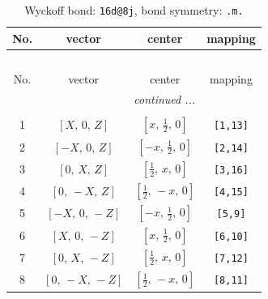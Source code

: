 \documentclass[fleqn,8pt]{jsarticle}
\begin{document}
\begin{longtable}{cccc}
\caption{Wyckoff bond: {\tt 16d@8j}, bond symmetry: {\tt .m.}}
 \\
 \hline \hline
No. & vector & center & mapping \\ \hline \endfirsthead

\multicolumn{3}{l}{\tablename\ \thetable{}} \\
 \hline \hline
No. & vector & center & mapping \\ \hline \endhead

 \hline \hline
\multicolumn{3}{r}{\footnotesize\it continued ...} \\ \endfoot

 \hline \hline
\multicolumn{3}{r}{} \\ \endlastfoot

1 & $\left[ X,\, 0,\, Z \right]$ & $\left[ x,\, \frac{1}{2},\, 0 \right]$ & {\tt [1,13]} \\ \hline
2 & $\left[ - X,\, 0,\, Z \right]$ & $\left[ - x,\, \frac{1}{2},\, 0 \right]$ & {\tt [2,14]} \\ \hline
3 & $\left[ 0,\, X,\, Z \right]$ & $\left[ \frac{1}{2},\, x,\, 0 \right]$ & {\tt [3,16]} \\ \hline
4 & $\left[ 0,\, - X,\, Z \right]$ & $\left[ \frac{1}{2},\, - x,\, 0 \right]$ & {\tt [4,15]} \\ \hline
5 & $\left[ - X,\, 0,\, - Z \right]$ & $\left[ - x,\, \frac{1}{2},\, 0 \right]$ & {\tt [5,9]} \\ \hline
6 & $\left[ X,\, 0,\, - Z \right]$ & $\left[ x,\, \frac{1}{2},\, 0 \right]$ & {\tt [6,10]} \\ \hline
7 & $\left[ 0,\, X,\, - Z \right]$ & $\left[ \frac{1}{2},\, x,\, 0 \right]$ & {\tt [7,12]} \\ \hline
8 & $\left[ 0,\, - X,\, - Z \right]$ & $\left[ \frac{1}{2},\, - x,\, 0 \right]$ & {\tt [8,11]} \\
\end{longtable}
\renewcommand{\arraystretch}{1.2}
\end{document}
